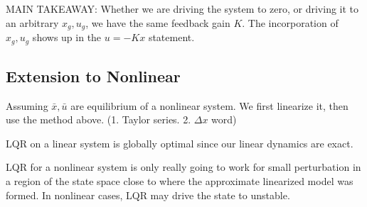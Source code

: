 MAIN TAKEAWAY: 
Whether we are driving the system to zero, or driving it to an arbitrary $x_g,u_g$, we have the same feedback gain $K$. The incorporation of $x_g,u_g$ shows up in the $u = -Kx$ statement.
\subsection{Extension to Nonlinear}

Assuming $\bar{x}, \bar{u}$ are equilibrium of a nonlinear system. We first linearize it, then use the method above. (1. Taylor series. 2. $\Delta x$ word)

LQR on a linear system is globally optimal since our linear dynamics are exact. 

LQR for a nonlinear system is only really going to work for small perturbation in a region of the state space close to where the approximate linearized model was formed. In nonlinear cases, LQR may drive the state to unstable.